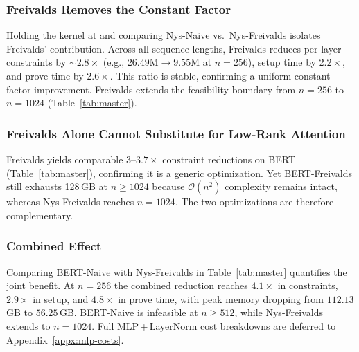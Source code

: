\subsubsection{Freivalds Removes the Constant Factor}
\label{subsec:freivalds-benefit}
Holding the kernel at \nystrom and comparing Nys-Naive vs.\ Nys-Freivalds isolates Freivalds' contribution. Across all sequence lengths, Freivalds reduces per-layer constraints by ${\sim}2.8{\times}$ (e.g., $26.49$M$\to$$9.55$M at $n{=}256$), setup time by $2.2{\times}$, and prove time by $2.6{\times}$. This ratio is stable, confirming a uniform constant-factor improvement. Freivalds extends the feasibility boundary from $n{=}256$ to $n{=}1024$ (Table~\ref{tab:master}).

\subsubsection{Freivalds Alone Cannot Substitute for Low-Rank Attention}
\label{subsec:freivalds-not-enough}
Freivalds yields comparable $3$--$3.7{\times}$ constraint reductions on BERT (Table~\ref{tab:master}), confirming it is a generic optimization. Yet BERT-Freivalds still exhausts 128\,GB at $n{\geq}1024$ because $\mathcal{O}(n^2)$ complexity remains intact, whereas Nys-Freivalds reaches $n{=}1024$. The two optimizations are therefore complementary.

\subsubsection{Combined Effect}
\label{subsec:combined-effect}
Comparing BERT-Naive with Nys-Freivalds in Table~\ref{tab:master} quantifies the joint benefit. At $n{=}256$ the combined reduction reaches $4.1{\times}$ in constraints, $2.9{\times}$ in setup, and $4.8{\times}$ in prove time, with peak memory dropping from $112.13$\,GB to $56.25$\,GB. BERT-Naive is infeasible at $n{\geq}512$, while Nys-Freivalds extends to $n{=}1024$.  Full MLP\,+\,LayerNorm cost breakdowns are deferred to Appendix~\ref{appx:mlp-costs}.

